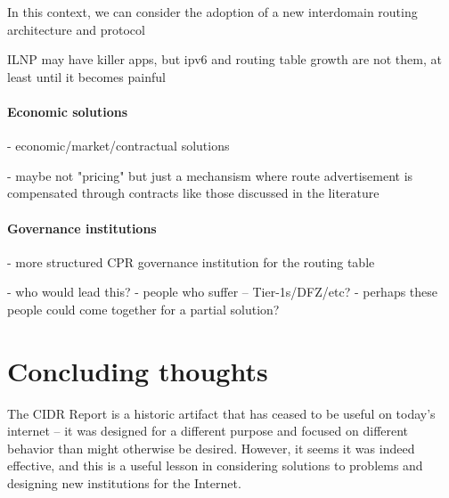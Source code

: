 In this context, we can consider the adoption of a new interdomain routing
architecture and protocol

ILNP \cite{Atkinson:2010zr} may have killer apps, but ipv6 and routing table
growth are not them, at least until it becomes painful

\paragraph{Economic solutions}
- economic/market/contractual solutions

- maybe not "pricing" but just a mechansism where route advertisement is
  compensated through contracts like those discussed in the literature

\paragraph{Governance institutions}
- more structured CPR governance institution for the routing table

- who would lead this?
    - people who suffer -- Tier-1s/DFZ/etc?
    - perhaps these people could come together for a partial
      solution?


%
%

\section{Concluding thoughts}
The CIDR Report is a historic artifact that has ceased to be useful on today's
internet -- it was designed for a different purpose and focused on different
behavior than might otherwise be desired. However, it seems it was indeed
effective, and this is a useful lesson in considering solutions to problems and
designing new institutions for the Internet.

